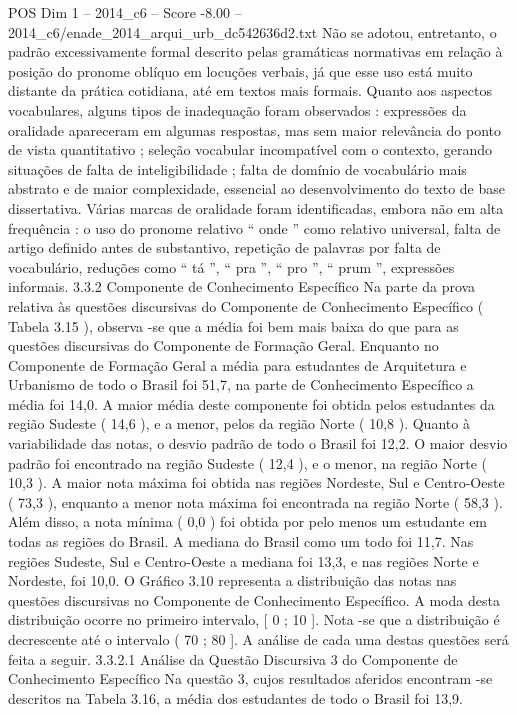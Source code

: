 \begin{textsample}{POS Dim 1 – 2014\_c6 – Score -8.00 – 2014\_c6/enade\_2014\_arqui\_urb\_dc542636d2.txt}
Não se adotou, entretanto, o padrão excessivamente formal descrito pelas gramáticas normativas em relação à posição do pronome oblíquo em locuções verbais, já que esse uso está muito distante da prática cotidiana, até em textos mais formais.
Quanto aos aspectos vocabulares, alguns tipos de inadequação foram observados : expressões da oralidade apareceram em algumas respostas, mas sem maior relevância do ponto de vista quantitativo ; seleção vocabular incompatível com o contexto, gerando situações de falta de inteligibilidade ; falta de domínio de vocabulário mais abstrato e de maior complexidade, essencial ao desenvolvimento do texto de base dissertativa.
Várias marcas de oralidade foram identificadas, embora não em alta frequência : o uso do pronome relativo “ onde ” como relativo universal, falta de artigo definido antes de substantivo, repetição de palavras por falta de vocabulário, reduções como “ tá ”, “ pra ”, “ pro ”, “ prum ”, expressões informais. 3.3.2 Componente de Conhecimento Específico Na parte da prova relativa às questões discursivas do Componente de Conhecimento Específico ( Tabela 3.15 ), observa -se que a média foi bem mais baixa do que para as questões discursivas do Componente de Formação Geral.
Enquanto no Componente de Formação Geral a média para estudantes de Arquitetura e Urbanismo de todo o Brasil foi 51,7, na parte de Conhecimento Específico a média foi 14,0.
A maior média deste componente foi obtida pelos estudantes da região Sudeste ( 14,6 ), e a menor, pelos da região Norte ( 10,8 ).
Quanto à variabilidade das notas, o desvio padrão de todo o Brasil foi 12,2.
O maior desvio padrão foi encontrado na região Sudeste ( 12,4 ), e o menor, na região Norte ( 10,3 ).
A maior nota máxima foi obtida nas regiões Nordeste, Sul e Centro-Oeste ( 73,3 ), enquanto a menor nota máxima foi encontrada na região Norte ( 58,3 ).
Além disso, a nota mínima ( 0,0 ) foi obtida por pelo menos um estudante em todas as regiões do Brasil.
A mediana do Brasil como um todo foi 11,7.
Nas regiões Sudeste, Sul e Centro-Oeste a mediana foi 13,3, e nas regiões Norte e Nordeste, foi 10,0.
O Gráfico 3.10 representa a distribuição das notas nas questões discursivas no Componente de Conhecimento Específico.
A moda desta distribuição ocorre no primeiro intervalo, [ 0 ; 10 ].
Nota -se que a distribuição é decrescente até o intervalo ( 70 ; 80 ].
A análise de cada uma destas questões será feita a seguir. 3.3.2.1 Análise da Questão Discursiva 3 do Componente de Conhecimento Específico Na questão 3, cujos resultados aferidos encontram -se descritos na Tabela 3.16, a média dos estudantes de todo o Brasil foi 13,9.

\end{textsample}
